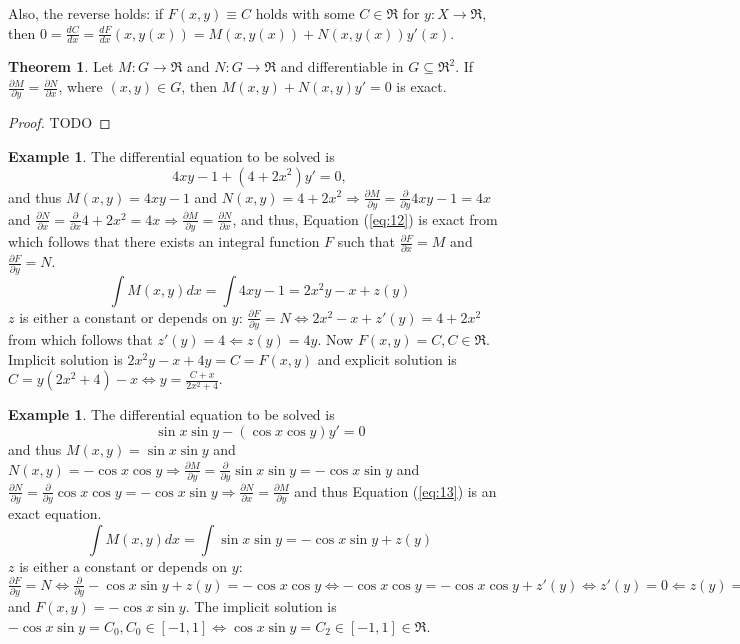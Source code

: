 \documentclass[10pt,a4paper]{article}
\theoremstyle{definition}
\newtheorem{example}[defn]{Example}
\newtheorem{thm}{Theorem}[section]
\begin{document}
Also, the reverse holds: if $F(x, y) \equiv C$ holds with some $C \in \Re$ for
$y: X \to \Re$, then $0 = \frac{dC}{dx} = \frac{dF}{dx}(x,y(x)) = M(x, y(x)) +
N(x, y(x)) y'(x)$.
\begin{thm}
Let $M: G \to \Re$ and $N: G \to \Re$ and differentiable in $G \subseteq
\Re^2$. If $\frac{\partial M}{\partial y} = \frac{\partial N}{\partial x}$,
where $(x, y) \in G$, then $M(x,y) + N(x,y) y' = 0$ is exact.
\begin{proof}
TODO
\end{proof} 
\end{thm}
\begin{example}
The differential equation to be solved is
\begin{equation} \label{eq:12}
  4 x y - 1 + (4 + 2x^2) y' = 0,
\end{equation}
and thus $M(x, y) = 4 x y - 1$ and $N(x, y) = 4 + 2 x^2 \Rightarrow
\frac{\partial M}{\partial y} = \frac{\partial}{\partial y} 4 x y - 1 = 4 x$
and $\frac{\partial N}{\partial x} = \frac{\partial}{\partial x} 4 + 2 x^2 = 4
x \Rightarrow \frac{\partial M}{\partial y} = \frac{\partial N}{\partial x}$,
and thus, Equation (\ref{eq:12}) is exact from which follows that there exists
an integral function $F$ such that $\frac{\partial F}{\partial x} = M$ and
$\frac{\partial F}{\partial y} = N$.
\[
  \int M(x, y) dx = \int 4 xy - 1 = 2 x^2 y - x + z(y)
\]
$z$ is either a constant or depends on $y$: $\frac{\partial F}{\partial y} = N
\Leftrightarrow 2 x^2 - x + z'(y) = 4 + 2 x^2$ from which follows that $z'(y) =
4 \Leftarrow z(y) = 4 y$. Now $F(x, y) = C, C \in \Re$. Implicit solution is $2
x^2 y - x + 4 y = C = F(x, y)$ and explicit solution is $C = y (2 x^2 + 4) - x
\Leftrightarrow y = \frac{C + x}{2 x^2 + 4}$.
\end{example}
\begin{example}
The differential equation to be solved is
\begin{equation} \label{eq:13}
  \sin x \sin y - (\cos x \cos y) y' = 0
\end{equation}
and thus $M(x, y) = \sin x \sin y$ and $N(x, y) = -\cos x \cos y \Rightarrow
\frac{\partial M}{\partial y} = \frac{\partial}{\partial y} \sin x \sin y = -
\cos x \sin y$ and $\frac{\partial N}{\partial y} = \frac{\partial}{\partial y}
\cos x \cos y = -\cos x \sin y \Rightarrow \frac{\partial N}{\partial x} =
\frac{\partial M}{\partial y}$ and thus Equation (\ref{eq:13}) is an exact
equation.
\[
  \int M(x, y) dx = \int \sin x \sin y = -\cos x \sin y + z(y)
\]
$z$ is either a constant or depends on $y$: $\frac{\partial F}{\partial y} = N
\Leftrightarrow \frac{\partial}{\partial y} -\cos x \sin y + z(y) = -\cos x
\cos y \Leftrightarrow -\cos x \cos y = -\cos x \cos y + z'(y) \Leftrightarrow
z'(y) = 0 \Leftarrow z(y) = 0$ and $F(x, y) = -\cos x \sin y$. The implicit
solution is $-\cos x \sin y = C_0, C_0 \in [-1, 1] \Leftrightarrow \cos x \sin
y = C_2 \in [-1, 1] \in \Re$.
\end{example}
\end{document}
